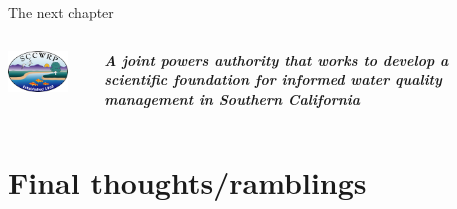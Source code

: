 \documentclass[serif]{beamer}\usepackage[]{graphicx}\usepackage[]{color}
\newcommand{\emtxt}[1]{\textbf{\textit{#1}}}
\begin{document}
\begin{frame}[t]{The next chapter}{}
\begin{columns}
\begin{column}{0.3\textwidth}
\centerline{\includegraphics[width = 0.8\textwidth]{fig/sccwrp.png}}
\end{column}
\begin{column}{0.7\textwidth}
\emtxt{A joint powers authority that works to develop a scientific foundation for informed water quality management in Southern California}
\end{column}
\end{columns}
\vspace{0.25in}
\centerline{}
\end{frame}

\section{Final thoughts/ramblings}
\end{document}
